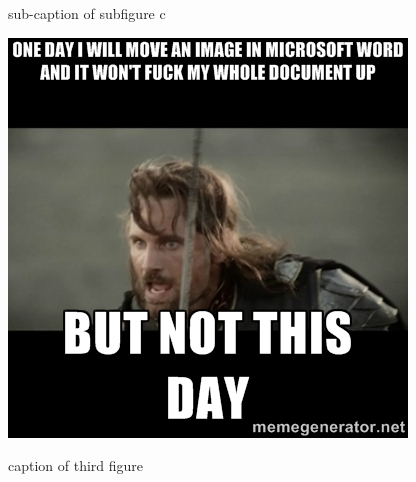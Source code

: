 \documentclass{article}
\begin{document}
\begin{figure}[h]
{\begin{subfloatrow}[3]
        \ffigbox
        {
         \caption{sub-caption of subfigure c}
         \label{subfig3}
        }
        {\includegraphics[width=\linewidth]{./img/62392602}}
    \end{subfloatrow} 
    }
    {
     \caption{caption of third figure}
     \label{fig3}
    }
\end{figure}

     
\end{document}
